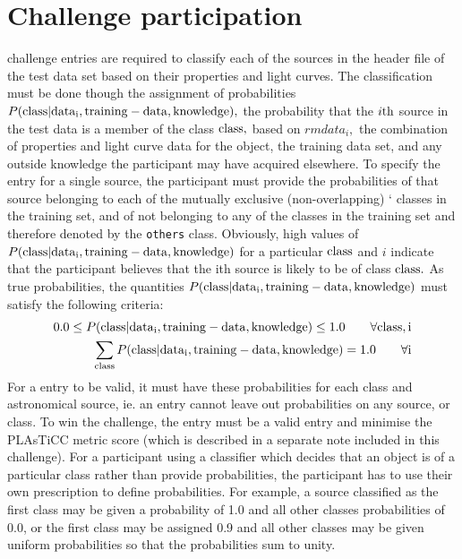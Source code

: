 \documentclass[\docopts]{\docclass}
\begin{document}
\section{Challenge participation}
\label{sec:conclusion}
{\plasticc} challenge entries are required to classify each of the sources in the header file of the test data set  based on their properties and light curves. The classification must be done though the assignment of probabilities $P(\rm{class}\vert\rm{data}_{i}, \rm{training-data}, \rm{knowledge}),$  the probability that the $i\rm{th}$ source in the test data is a member of the class $\rm{class},$ based on $rm{data}_i,$ the combination of properties and light curve data for the object, the training data set, and any outside knowledge the participant may have acquired elsewhere. To specify the entry for a single source, the participant must provide the probabilities of that source belonging to each of the mutually exclusive (non-overlapping) `{{\numclasses}}  classes in the training set, and of not belonging to any of the classes in the training set and therefore denoted by the {\tt others} class. Obviously, high values of $P(\rm{class}\vert\rm{data}_{i}, \rm{training-data}, \rm{knowledge})$ for a particular $\rm{class}$ and $i$ indicate that the participant believes that the ith source is likely to be of class $\rm{class}.$ 
As true probabilities, the quantities $P(\rm{class}\vert\rm{data}_{i}, \rm{training-data}, \rm{knowledge})$ must satisfy the following criteria:
\begin{eqnarray*}
0.0 \leq P(\rm{class}\vert\rm{data}_{i}, \rm{training-data}, \rm{knowledge}) \leq 1.0 \qquad \forall \rm{class}, i\nonumber \\
\sum_{\rm{class}} P(\rm{class}\vert\rm{data}_{i}, \rm{training-data}, \rm{knowledge}) = 1.0 \qquad \forall i
\nonumber
\end{eqnarray*}
For a {\plasticc} entry to be valid, it must have these probabilities for each class and astronomical source, ie. an entry cannot leave out probabilities on any source, or class. To win the challenge, the entry must be a valid entry and minimise the PLAsTiCC metric score (which is described in a separate note included in this challenge). 
For a participant using a classifier which decides that an object is of a particular class rather than provide probabilities, the participant has to use their own prescription to define probabilities. For example, a source classified as the first class may be given a probability of 1.0 and all other classes probabilities of 0.0, or the first class may be assigned 0.9 and all other classes may be given uniform probabilities so that the probabilities sum to unity. 
\end{document}
